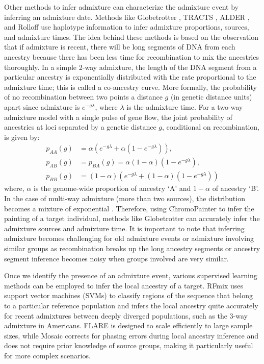 Other methods to infer admixture can characterize the admixture event by inferring an admixture date. Methods like Globetrotter \cite{hellenthal2014genetic}, TRACTS \cite{gravel2012population}, ALDER \cite{loh2013inferring}, and Rolloff \cite{moorjani2011history, patterson2012ancient} use haplotype information to infer admixture proportions, sources, and admixture times. The idea behind these methods is based on the observation that if admixture is recent, there will be long segments of DNA from each ancestry because there has been less time for recombination to mix the ancestries thoroughly. In a simple 2-way admixture, the length of the DNA segment from a particular ancestry is exponentially distributed with the rate proportional to the admixture time; this is called a co-ancestry curve. More formally, the probability of no recombination between two points a distance $g$ (in genetic distance units) apart since admixture is $e^{-g\lambda}$, where $\lambda$ is the admixture time. For a two-way admixture model with a single pulse of gene flow, the joint probability of ancestries at loci separated by a genetic distance $g$, conditional on recombination, is given by:
\begin{equation}
\begin{aligned}
    p_{AA}(g) &= \alpha ( e^{-g\lambda} + \alpha (1-e^{-g\lambda} )), \\
    p_{AB}(g) &= p_{BA}(g) = \alpha (1 - \alpha) (1 - e^{-g\lambda}), \\
    p_{BB}(g) &= (1-\alpha) ( e^{-g\lambda} + (1-\alpha) (1-e^{-g\lambda} ))
\end{aligned}
\end{equation}
where, $\alpha$ is the genome-wide proportion of ancestry `A' and $1-\alpha$ of ancestry `B'. In the case of multi-way admixture (more than two sources), the distribution becomes a mixture of exponential \cite{hellenthal2014genetic}. Therefore, using ChromoPainter to infer the painting of a target individual, methods like Globetrotter can accurately infer the admixture sources and admixture time. It is important to note that inferring admixture becomes challenging for old admixture events or admixture involving similar groups as recombination breaks up the long ancestry segments or ancestry segment inference becomes noisy when groups involved are very similar.

Once we identify the presence of an admixture event, various supervised learning methods can be employed to infer the local ancestry of a target. RFmix \cite{maples2013rfmix} uses support vector machines (SVMs) to classify regions of the sequence that belong to a particular reference population and infers the local ancestry quite accurately for recent admixtures between deeply diverged populations, such as the 3-way admixture in Americans. FLARE \cite{browning2023fast} is designed to scale efficiently to large sample sizes, while Mosaic \cite{salter2019fine} corrects for phasing errors during local ancestry inference and does not require prior knowledge of source groups, making it particularly useful for more complex scenarios.

